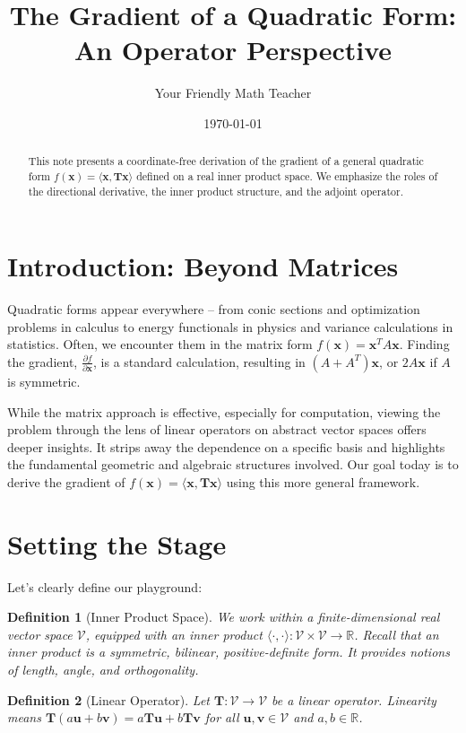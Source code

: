 \documentclass[11pt]{article}
\title{The Gradient of a Quadratic Form: An Operator Perspective}
\author{Your Friendly Math Teacher}
\date{\today}
\theoremstyle{mydefinitionstyle}
\newtheorem{definition}{Definition}[section]
\theoremstyle{mytheoremstyle}
\theoremstyle{remark}
\newcommand{\R}{\mathbb{R}}
\newcommand{\V}{\mathcal{V}} %
\newcommand{\T}{\mathbf{T}} %
\newcommand{\x}{\mathbf{x}} %
\newcommand{\uvec}{\mathbf{u}} %
\newcommand{\vvec}{\mathbf{v}} %
\newcommand{\inner}[2]{\langle #1, #2 \rangle} %
\newcommand{\pdx}[1]{\frac{\partial #1}{\partial \x}} %
\begin{document}
\maketitle

\begin{abstract}
    This note presents a coordinate-free derivation of the gradient of a general quadratic form $f(\x) = \inner{\x}{\T\x}$ defined on a real inner product space. We emphasize the roles of the directional derivative, the inner product structure, and the adjoint operator.
\end{abstract}

\section{Introduction: Beyond Matrices}

Quadratic forms appear everywhere – from conic sections and optimization problems in calculus to energy functionals in physics and variance calculations in statistics. Often, we encounter them in the matrix form $f(\x) = \x^T A \x$. Finding the gradient, $\pdx{f}$, is a standard calculation, resulting in $(A + A^T)\x$, or $2A\x$ if $A$ is symmetric.

While the matrix approach is effective, especially for computation, viewing the problem through the lens of linear operators on abstract vector spaces offers deeper insights. It strips away the dependence on a specific basis and highlights the fundamental geometric and algebraic structures involved. Our goal today is to derive the gradient of $f(\x) = \inner{\x}{\T\x}$ using this more general framework.

\section{Setting the Stage}

Let's clearly define our playground:
\begin{definition}[Inner Product Space]
    We work within a finite-dimensional real vector space $\V$, equipped with an inner product $\inner{\cdot}{\cdot}: \V \times \V \to \R$. Recall that an inner product is a symmetric, bilinear, positive-definite form. It provides notions of length, angle, and orthogonality.
\end{definition}

\begin{definition}[Linear Operator]
    Let $\T: \V \to \V$ be a linear operator. Linearity means $\T(a\uvec + b\vvec) = a\T\uvec + b\T\vvec$ for all $\uvec, \vvec \in \V$ and $a, b \in \R$.
\end{definition}
\end{document}
